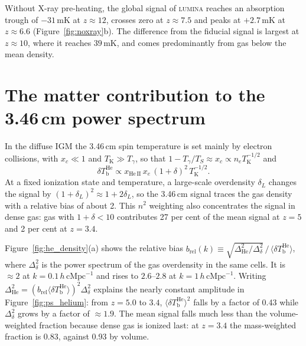 \documentclass[apj,twocolumn, appendixfloats, twocolappendix, numberedappendix, tighten]{openjournal}
\DeclareRobustCommand{\lumina}{\mbox{\textsc{lumina}}\xspace}
\begin{document}
\begin{appendix}

Without X-ray pre-heating, the global signal of \lumina reaches an absorption trough of $-31$\,mK at $z \approx 12$, crosses zero at $z \approx 7.5$ and peaks at $+2.7$\,mK at $z \approx 6.6$ (Figure~\ref{fig:noxray}b). The difference from the fiducial signal is largest at $z \approx 10$, where it reaches $39$\,mK, and comes predominantly from gas below the mean density.

\section{The matter contribution to the 3.46\,cm power spectrum} \label{app:he_density}

In the diffuse IGM the 3.46\,cm spin temperature is set mainly by electron collisions, with $x_c \ll 1$ and $T_\mathrm{K} \gg T_\gamma$, so that $1 - T_\gamma/T_S \approx x_c \propto n_e T_\mathrm{K}^{-1/2}$ and
\begin{equation}
\delta T_\mathrm{b}^\mathrm{He} \propto x_\mathrm{He\,II}\, x_e\, (1+\delta)^2\, T_\mathrm{K}^{-1/2}.
\end{equation}
At a fixed ionization state and temperature, a large-scale overdensity $\delta_L$ changes the signal by $(1+\delta_L)^2 \approx 1 + 2\delta_L$, so the 3.46\,cm signal traces the gas density with a relative bias of about 2. This $n^2$ weighting also concentrates the signal in dense gas: gas with $1+\delta < 10$ contributes 27 per cent of the mean signal at $z = 5$ and 2 per cent at $z = 3.4$.

Figure~\ref{fig:he_density}(a) shows the relative bias $b_\mathrm{rel}(k) \equiv \sqrt{\Delta^2_\mathrm{He}/\Delta^2_\delta}\,/\,\langle\delta T_\mathrm{b}^\mathrm{He}\rangle$, where $\Delta^2_\delta$ is the power spectrum of the gas overdensity in the same cells. It is $\approx 2$ at $k = 0.1\,h\,\mathrm{cMpc}^{-1}$ and rises to $2.6$--$2.8$ at $k = 1\,h\,\mathrm{cMpc}^{-1}$. Writing $\Delta^2_\mathrm{He} = (b_\mathrm{rel}\langle\delta T_\mathrm{b}^\mathrm{He}\rangle)^2\Delta^2_\delta$ explains the nearly constant amplitude in Figure~\ref{fig:ps_helium}: from $z = 5.0$ to $3.4$, $\langle\delta T_\mathrm{b}^\mathrm{He}\rangle^2$ falls by a factor of 0.43 while $\Delta^2_\delta$ grows by a factor of $\approx 1.9$. The mean signal falls much less than the volume-weighted  fraction because dense gas is ionized last: at $z = 3.4$ the mass-weighted  fraction is 0.83, against 0.93 by volume.


\end{appendix}
\end{document}
